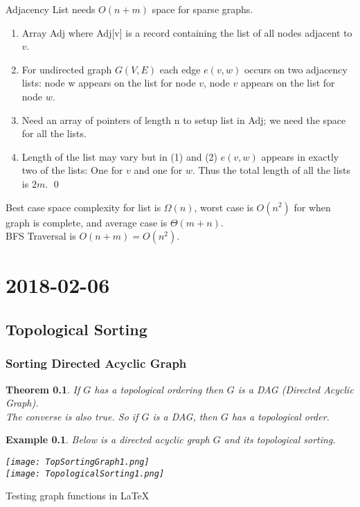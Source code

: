 \documentclass{report}
\newtheorem*{ex}{Example}
\newtheorem*{thrm}{Theorem}
\newcommand{\mychapter}[2]{
	\setcounter{chapter}{#1}
	\setcounter{section}{0}
	\chapter*{#2}
	\addcontentsline{toc}{chapter}{#2}
}
\begin{document}
Adjacency List needs $O(n+m)$ space for sparse graphs.
\begin{enumerate}
\item Array Adj where Adj[v] is a record containing the list of all nodes adjacent to $v$.
\item For undirected graph $G(V,E)$ each edge $e(v,w)$ occurs on two adjacency lists: node w appears on the list for node $v$, node $v$ appears on the list for node $w$.
\item Need an array of pointers of length n to setup list in Adj; we need the space for all the lists.
\item Length of the list may vary but in (1) and (2) $e(v,w)$ appears in exactly two of the lists: One for $v$ and one for $w$. Thus the total length of all the lists is $2m$. \qed
\end{enumerate}
Best case space complexity for list is $\Omega(n)$, worst case is $O(n^2)$ for when graph is complete, and average case is $\Theta(m+n)$.\\
BFS Traversal is $O(n+m) = O(n^2)$.

\mychapter{2}{2018-02-06}
\section{Topological Sorting}
\subsection{Sorting Directed Acyclic Graph}
\begin{thrm}
If $G$ has a topological ordering then $G$ is a DAG (Directed Acyclic Graph).\\
The converse is also true. So if $G$ is a DAG, then $G$ has a topological order.
\end{thrm}
\begin{ex}
Below is a directed acyclic graph $G$ and its topological sorting.
\begin{center}
\texttt{[image: TopSortingGraph1.png]}\\
\texttt{[image: TopologicalSorting1.png]}
\end{center}
\end{ex}
Testing graph functions in \LaTeX
{}
\end{document}
